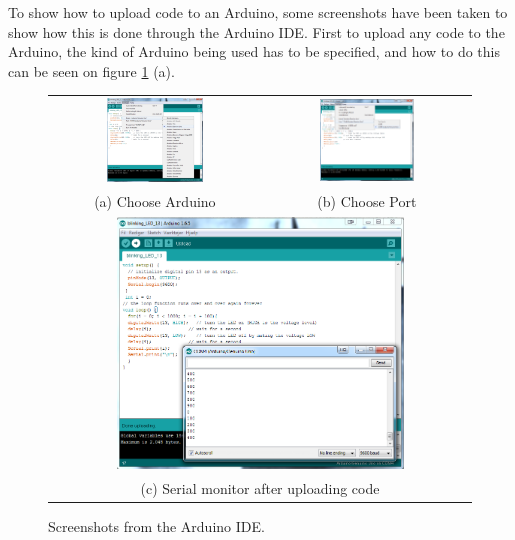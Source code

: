 To show how to upload code to an Arduino, some screenshots have been taken to show how this is done through the Arduino IDE.
First to upload any code to the Arduino, the kind of Arduino being used has to be specified, and how to do this can be seen on figure \ref{tab:ArduinoScreenshots} (a).
\begin{figure}
\begin{tabular}{cc}
  \includegraphics[width=0.48\textwidth]{Figures/ChooseArduino.png} &   \includegraphics[width=0.48\textwidth]{Figures/ChoosePort.png} \\
(a) Choose Arduino & (b) Choose Port \\[6pt]

\multicolumn{2}{c}{\includegraphics[width=0.7\textwidth]{Figures/SerialMonitor}} \\
\multicolumn{2}{c}{(c) Serial monitor after uploading code}
\end{tabular}
\caption{Screenshots from the Arduino IDE.}
\label{tab:ArduinoScreenshots}
\end{figure}


